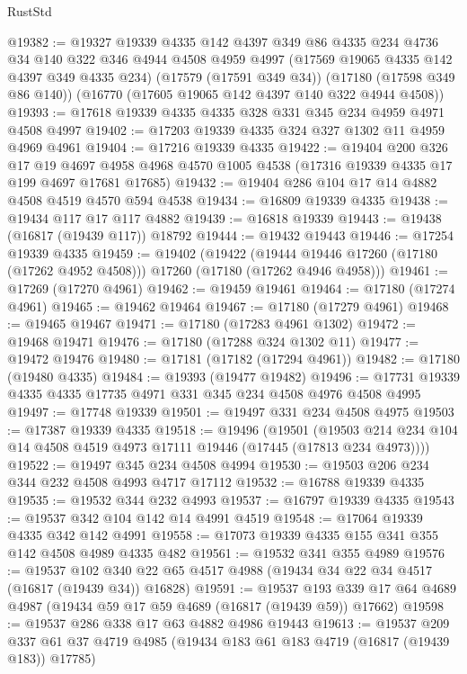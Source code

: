 \begin{lexlean}{RustStd}
\begin{coremodule}
{\begin{coremodule}
{{{{{{{{{{{{{{{{{{{{{{{{{{{{{{{{{{{{{{{{{{{{{{{{{{{{{{{@19382 := @19327
    @19339
    @4335
    @142
    @4397
    @349
    @86
    @4335
    @234
    @4736
    @34
    @140
    @322
    @346
    @4944
    @4508
    @4959
    @4997
    (@17569 @19065 @4335 @142 @4397 @349 @4335 @234)
    (@17579 (@17591 @349 @34))
    (@17180 (@17598 @349 @86 @140))
    (@16770 (@17605 @19065 @142 @4397 @140 @322 @4944 @4508))
@19393 := @17618 @19339 @4335 @4335 @328 @331 @345 @234 @4959 @4971 @4508 @4997
@19402 := @17203 @19339 @4335 @324 @327 @1302 @11 @4959 @4969 @4961
@19404 := @17216 @19339 @4335
@19422 := @19404
    @200
    @326
    @17
    @19
    @4697
    @4958
    @4968
    @4570
    @1005
    @4538
    (@17316 @19339 @4335 @17 @199 @4697 @17681 @17685)
@19432 := @19404 @286 @104 @17 @14 @4882 @4508 @4519 @4570 @594 @4538
@19434 := @16809 @19339 @4335
@19438 := @19434 @117 @17 @117 @4882
@19439 := @16818 @19339
@19443 := @19438 (@16817 (@19439 @117)) @18792
@19444 := @19432 @19443
@19446 := @17254 @19339 @4335
@19459 := @19402
    (@19422
      (@19444 @19446 @17260 (@17180 (@17262 @4952 @4508)))
      @17260
      (@17180 (@17262 @4946 @4958)))
@19461 := @17269 (@17270 @4961)
@19462 := @19459 @19461
@19464 := @17180 (@17274 @4961)
@19465 := @19462 @19464
@19467 := @17180 (@17279 @4961)
@19468 := @19465 @19467
@19471 := @17180 (@17283 @4961 @1302)
@19472 := @19468 @19471
@19476 := @17180 (@17288 @324 @1302 @11)
@19477 := @19472 @19476
@19480 := @17181 (@17182 (@17294 @4961))
@19482 := @17180 (@19480 @4335)
@19484 := @19393 (@19477 @19482)
@19496 := @17731 @19339 @4335 @4335 @17735 @4971 @331 @345 @234 @4508 @4976 @4508 @4995
@19497 := @17748 @19339
@19501 := @19497 @331 @234 @4508 @4975
@19503 := @17387 @19339 @4335
@19518 := @19496
    (@19501
      (@19503 @214 @234 @104 @14 @4508 @4519 @4973 @17111 @19446 (@17445 (@17813 @234 @4973))))
@19522 := @19497 @345 @234 @4508 @4994
@19530 := @19503 @206 @234 @344 @232 @4508 @4993 @4717 @17112
@19532 := @16788 @19339 @4335
@19535 := @19532 @344 @232 @4993
@19537 := @16797 @19339 @4335
@19543 := @19537 @342 @104 @142 @14 @4991 @4519
@19548 := @17064 @19339 @4335 @342 @142 @4991
@19558 := @17073 @19339 @4335 @155 @341 @355 @142 @4508 @4989 @4335 @482
@19561 := @19532 @341 @355 @4989
@19576 := @19537
    @102
    @340
    @22
    @65
    @4517
    @4988
    (@19434 @34 @22 @34 @4517 (@16817 (@19439 @34)) @16828)
@19591 := @19537
    @193
    @339
    @17
    @64
    @4689
    @4987
    (@19434 @59 @17 @59 @4689 (@16817 (@19439 @59)) @17662)
@19598 := @19537 @286 @338 @17 @63 @4882 @4986 @19443
@19613 := @19537
    @209
    @337
    @61
    @37
    @4719
    @4985
    (@19434 @183 @61 @183 @4719 (@16817 (@19439 @183)) @17785)
}}}}}}}}}}}}}}}}}}}}}}}}}}}}}}}}}}}}}}}}}}}}}}}}}}}}}}}
\end{coremodule}}
\end{coremodule}
\end{lexlean}
